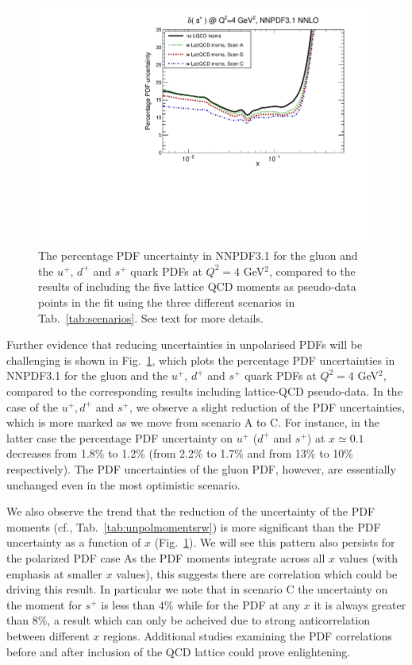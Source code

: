 \begin{figure}[!t]
\includegraphics[scale=0.45]{plots/xsp-unpol-lattice-relerr.pdf}
\caption{\small The percentage PDF uncertainty in NNPDF3.1  
  for the gluon and the $u^+$, $d^+$ and $s^+$ quark PDFs at
  $Q^2=4$ GeV$^2$,
  compared to the results of including the five lattice
  QCD moments as pseudo-data points in the fit using the three
  different scenarios in  Tab.~\ref{tab:scenarios}.
See text for more details.
}    
\label{fig:impactUnpol}
\end{figure}

Further evidence that reducing uncertainties in unpolarised PDFs will be 
challenging is shown in Fig.~\ref{fig:impactUnpol}, which plots the percentage 
PDF uncertainties in NNPDF3.1 for the gluon and the
$u^+$, $d^+$ and $s^+$ quark PDFs at $Q^2=4$ GeV$^2$, compared to the 
corresponding results including lattice-QCD pseudo-data.
%
In the case of the $u^+,d^+$ and $s^+$, we observe a slight reduction
of the PDF uncertainties, which is more marked as we move
from scenario A to C.
%
For instance, in the latter case the percentage PDF
uncertainty on $u^+$ ($d^+$ and $s^+$) at $x\simeq 0.1$
decreases from 1.8\% to 1.2\% (from 2.2\% to 1.7\% and from 13\% to 10\% respectively).
%
The PDF uncertainties of the gluon PDF, however,
are essentially unchanged even in the most optimistic scenario.

% 

We also observe the trend that the  reduction of the uncertainty 
of the PDF moments (cf.,  Tab.~\ref{tab:unpolmomentsrw})
is  more significant than the PDF uncertainty as a function of $x$  (Fig.~\ref{fig:impactUnpol}).
We will see this pattern also persists for the polarized PDF case
%
As the PDF moments integrate across all $x$  values (with emphasis at smaller $x$ values), 
this suggests there are correlation which could be driving this result.
In particular we note that in scenario C the uncertainty on the moment for 
$s^+$ is less than $4\%$ while for the PDF at any $x$ it is always greater 
than  $8\%$, a result which can only be acheived due to strong anticorrelation
between different $x$ regions. 
Additional studies examining the PDF correlations before and after inclusion of the 
QCD lattice could prove enlightening. 


